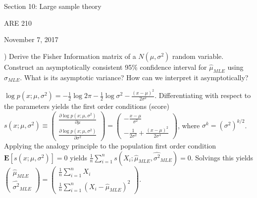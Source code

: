 \documentclass[12pt,english]{article}
\begin{document}
\begin{center}
{\Large{}Section 10: Large sample theory}
\par\end{center}{\Large \par}

\begin{center}
ARE 210
\par\end{center}

\begin{center}
November 7, 2017
\par\end{center}

) Derive the Fisher Information matrix of a $N(\mu, \sigma^{2})$ random variable. Construct an asymptotically consistent 95\% confidence interval for $\widehat{\mu}_{MLE}$ using $\widehat{\sigma}_{MLE}$. What is its asymptotic variance? How can we interpret it asymptotically?
\vspace{1em}

$\log p(x; \mu, \sigma^{2}) = - \frac{1}{2} \log 2 \pi - \frac{1}{2} \log \sigma^{2} - \frac{(x - \mu)^{2}}{2 \sigma^{2}}$. Differentiating with respect to the parameters yields the first order conditions (score) $s(x; \mu, \sigma^{2}) \equiv \left( \begin{array}{c} \frac{\partial \log p(x; \mu, \sigma^{2})}{\partial \mu} \\ \frac{\partial \log p(x; \mu, \sigma^{2})}{\partial \sigma^{2}} \end{array}\right) = \left( \begin{array}{c} - \frac{x - \mu}{\sigma^{2}} \\ -\frac{1}{2 \sigma^{2}} + \frac{(x - \mu)^{2}}{2 \sigma^{4}} \end{array}\right) $, where $\sigma^{k} = (\sigma^{2})^{k/2}$. Applying the analogy principle to the population first order condition $\mathbf{E}[s(x; \mu, \sigma^{2})] = 0$ yields $\frac{1}{n} \sum_{i=1}^{n} s(X_{i}; \hat{\mu}_{MLE}, \hat{\sigma^{2}}_{MLE}) = 0$. Solvings this yields $\left( \begin{array}{c} \hat{\mu}_{MLE} \\ \hat{\sigma^{2}}_{MLE} \end{array} \right) = \left( \begin{array}{c} \frac{1}{n} \sum_{i=1}^{n} X_{i} \\ \frac{1}{n} \sum_{i=1}^{n} (X_{i} - \hat{\mu}_{MLE})^{2} \end{array} \right)$.
\end{document}
